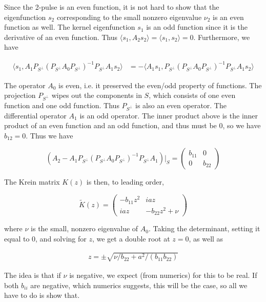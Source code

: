\documentclass[12pt]{article}
\begin{document}
Since the 2-pulse is an even function, it is not hard to show that the eigenfunction $s_2$ corresponding to the small nonzero eigenvalue $\nu_2$ is an even function as well. The kernel eigenfunction $s_1$ is an odd function since it is the derivative of an even function. Thus $\langle s_1, A_2 s_2 \rangle = \langle s_1, s_2 \rangle = 0$. Furthermore, we have

\begin{align*}
\langle s_1, A_1 P_{S^\perp} (P_{S^\perp} A_0 P_{S^\perp})^{-1} P_{S^\perp} A_1 s_2 \rangle 
&= -\langle A_1 s_1, P_{S^\perp} (P_{S^\perp} A_0 P_{S^\perp})^{-1} P_{S^\perp} A_1 s_2 \rangle 
\end{align*}

The operator $A_0$ is even, i.e. it preserved the even/odd property of functions. The projection $P_{S^\perp}$ wipes out the components in $S$, which consists of one even function and one odd function. Thus $P_{S^\perp}$ is also an even operator. The differential operator $A_1$ is an odd operator. The inner product above is the inner product of an even function and an odd function, and thus must be 0, so we have $b_{12} = 0$. Thus we have

\[
\left( A_2 - A_1 P_{S^\perp} (P_{S^\perp} A_0 P_{S^\perp})^{-1} P_{S^\perp} A_1 \right)|_S = \begin{pmatrix} b_{11} & 0 \\ 0 & b_{22} \end{pmatrix}
\]

The Krein matrix $K(z)$ is then, to leading order,

\begin{equation}
\tilde{K}(z) = \begin{pmatrix}
-b_{11} z^2 & i a z \\
i a z & -b_{22} z^2 + \nu
\end{pmatrix}
\end{equation}

where $\nu$ is the small, nonzero eigenvalue of $A_0$. Taking the determinant, setting it equal to 0, and solving for $z$, we get a double root at $z = 0$, as well as

\begin{align*}
z = \pm \sqrt{\nu /b_{22} + a^2/(b_{11} b_{22})}
\end{align*} 

The idea is that if $\nu$ is negative, we expect (from numerics) for this to be real. If both $b_{ii}$ are negative, which numerics suggests, this will be the case, so all we have to do is show that.\\
\end{document}
